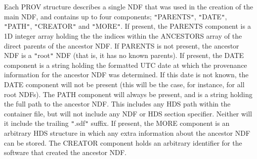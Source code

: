 {{{         \sstitem
         Each PROV structure describes a single NDF that was used in the
         creation of the main NDF, and contains up to four components; {\tt "}PARENTS{\tt "},
         {\tt "}DATE{\tt "}, {\tt "}PATH{\tt "}, {\tt "}CREATOR{\tt "} and {\tt "}MORE{\tt "}. If present, the PARENTS component
         is a 1D integer array holding the the indices within the ANCESTORS array
         of the direct parents of the ancestor NDF. If PARENTS is not present,
         the ancestor NDF is a {\tt "}root{\tt "} NDF (that is, it has no known parents).
         If present, the DATE component is a string holding the formatted UTC
         date at which the provenance information for the ancestor NDF was
         determined. If this date is not known, the DATE component will not
         be present (this will be the case, for instance, for all root NDFs).
         The PATH component will always be present, and is a string holding
         the full path to the ancestor NDF. This includes any HDS path
         within the container file, but will not include any NDF or HDS section
         specifier. Neither will it include the trailing {\tt "}.sdf{\tt "} suffix. If
         present, the MORE component is an arbitrary HDS structure in which
         any extra information about the ancestor NDF can be stored. The
         CREATOR component holds an arbitrary identifier for the software that
         created the ancestor NDF.
      }
   }
}

